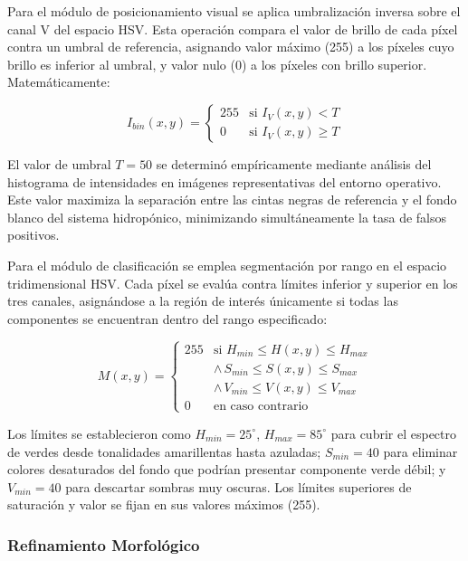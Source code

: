 Para el módulo de posicionamiento visual se aplica umbralización inversa sobre el canal V del espacio HSV. Esta operación compara el valor de brillo de cada píxel contra un umbral de referencia, asignando valor máximo (255) a los píxeles cuyo brillo es inferior al umbral, y valor nulo (0) a los píxeles con brillo superior. Matemáticamente:

\begin{equation}
I_{bin}(x,y) = \begin{cases}
255 & \text{si } I_V(x,y) < T \\
0 & \text{si } I_V(x,y) \geq T
\end{cases}
\end{equation}

El valor de umbral $T = 50$ se determinó empíricamente mediante análisis del histograma de intensidades en imágenes representativas del entorno operativo. Este valor maximiza la separación entre las cintas negras de referencia y el fondo blanco del sistema hidropónico, minimizando simultáneamente la tasa de falsos positivos.

Para el módulo de clasificación se emplea segmentación por rango en el espacio tridimensional HSV. Cada píxel se evalúa contra límites inferior y superior en los tres canales, asignándose a la región de interés únicamente si todas las componentes se encuentran dentro del rango especificado:

\begin{equation}
M(x,y) = \begin{cases}
255 & \text{si } H_{min} \leq H(x,y) \leq H_{max} \\
& \land \, S_{min} \leq S(x,y) \leq S_{max} \\
& \land \, V_{min} \leq V(x,y) \leq V_{max} \\
0 & \text{en caso contrario}
\end{cases}
\end{equation}

Los límites se establecieron como $H_{min} = 25^\circ$, $H_{max} = 85^\circ$ para cubrir el espectro de verdes desde tonalidades amarillentas hasta azuladas; $S_{min} = 40$ para eliminar colores desaturados del fondo que podrían presentar componente verde débil; y $V_{min} = 40$ para descartar sombras muy oscuras. Los límites superiores de saturación y valor se fijan en sus valores máximos (255).

\subsubsection{Refinamiento Morfológico}

